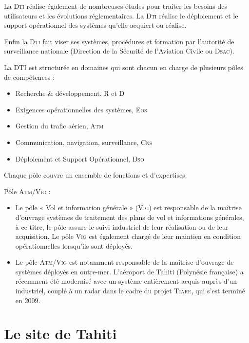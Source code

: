 La \textsc{Dti} réalise également de nombreuses études pour traiter les besoins des utilisateurs et les évolutions réglementaires. La \textsc{Dti} réalise le déploiement et le support opérationnel des systèmes qu’elle acquiert ou réalise. 

Enfin la \textsc{Dti} fait viser ses systèmes, procédures et formation par l’autorité de surveillance nationale (Direction de la Sécurité de l'Aviation Civile ou \textsc{Dsac}).

La DTI est structurée en domaines qui sont chacun en charge de plusieurs pôles de compétences :
\begin{itemize}
    \item Recherche \& développement, R et D
    \item Exigences opérationnelles des systèmes, \textsc{Eos}
    \item Gestion du trafic aérien, \textsc{Atm}
    \item Communication, navigation, surveillance, \textsc{Cns}
    \item Déploiement et Support Opérationnel, \textsc{Dso}
\end{itemize}\medskip

Chaque pôle couvre un ensemble de fonctions et d’expertises.

Pôle \textsc{Atm/Vig} :
\begin{itemize}
    \item Le pôle « Vol et information générale » (\textsc{Vig}) est responsable de la maîtrise d’ouvrage systèmes de traitement des plans de vol et informations générales, à ce titre, le pôle assure le suivi industriel de leur réalisation ou de leur acquisition. Le pôle \textsc{Vig} est également chargé de leur maintien en condition opérationnelles lorsqu’ils sont déployés.
    \item Le pôle \textsc{Atm/Vig} est notamment responsable de la maîtrise d’ouvrage de systèmes déployés en outre-mer. L’aéroport de Tahiti (Polynésie française) a récemment été modernisé avec un système entièrement acquis auprès d’un industriel, couplé à un radar dans le cadre du projet \textsc{Tiare}, qui s’est terminé en 2009.
\end{itemize}\medskip


\section{Le site de Tahiti}
